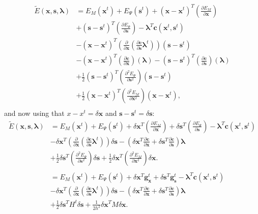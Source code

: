 \documentclass[letterpaper,12pt]{article}
\theoremstyle{remark}
\newcommand{\x}{\mathbf{x}}
\newcommand{\C}{\mathbf{c}}
\newcommand{\s}{\mathbf{s}}
\newcommand{\la}{\mathbf{\lambda}}
\newcommand{\dx}{\delta \x}
\newcommand{\ds}{\delta \s}
\newcommand{\gx}{ {\mathbf{g}_\x^t} }
\newcommand{\gs}{ {\mathbf{g}_\s^t} }
\begin{document}
\begin{equation}
\begin{split}
\tilde{E}(\x,\s,\la) &=  E_M(\x^t) + E_\Psi(\s^t) + 
(\x - \x^t)^T \left(\frac{\partial E_M}{\partial \x} \right)  \\
&+ (\s - \s^t)^T \left(\frac{\partial E_\Psi}{\partial \s} \right)   
 - \la^T \C (\x^t, \s^t) \\
& - (\x - \x^t)^T \left(
  \frac{\partial}{\partial \x} \left(\frac{\partial \C}{\partial \s} \la^t\right) \right)(\s - \s^t) \\
& - (\x - \x^t)^T \left(
  \frac{\partial \C }{\partial \x} \right)(\la) 
- (\s - \s^t)^T \left(
  \frac{\partial \C }{\partial \s} \right)(\la) \\
& + \frac{1}{2}(\s- \s^t)^T \left(\frac{\partial^2 E_\Psi}{\partial \s^2} \right)(\s - \s^t) \\
& + \frac{1}{2}(\x- \x^t)^T \left(\frac{\partial^2 E_M}{\partial \x^2}
\right)(\x - \x^t), \\
\end{split}
\end{equation}
and now using that $x - x^t = \dx$ and $\s - \s^t = \ds$:
\begin{equation}
\begin{split}
\tilde{E}(\x,\s,\la) &=  E_M(\x^t) + E_\Psi(\s^t) + 
\dx^T \left(\frac{\partial E_M}{\partial \x} \right) 
+ \ds^T \left(\frac{\partial E_\Psi}{\partial \s} \right)   
 - \la^T \C (\x^t, \s^t) \\
& - \dx^T \left(
  \frac{\partial}{\partial \x} \left(\frac{\partial \C}{\partial \s} \la^t\right) \right)\ds
- \left( \dx^T 
  \frac{\partial \C }{\partial \x}
+  \ds^T  
  \frac{\partial \C }{\partial \s} \right) \la \\
&+ \frac{1}{2}\ds^T \left(\frac{\partial^2 E_\Psi}{\partial \s^2} \right)\ds
+ \frac{1}{2} \dx^T \left(\frac{\partial^2 E_M}{\partial \x^2}
\right)\dx. \\
&\\
&=  E_M(\x^t) + E_\Psi(\s^t) + 
\dx^T \gx
+ \ds^T \gs
 - \la^T \C (\x^t, \s^t) \\
& - \dx^T \left(
  \frac{\partial}{\partial \x} \left(\frac{\partial \C}{\partial \s} \la^t\right) \right)\ds
- \left( \dx^T 
  \frac{\partial \C }{\partial \x}
+  \ds^T  
  \frac{\partial \C }{\partial \s} \right) \la \\
& + \frac{1}{2}\ds^T H^t \ds
+ \frac{1}{2h^2} \dx^T M \dx. \\
\end{split}
\end{equation}
\end{document}
